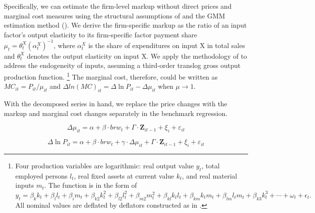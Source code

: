 Specifically, we can estimate the firm-level markup without direct prices and marginal cost measures using the structural assumptions of \cite{deloecker2012markups} and the GMM estimation method (\cite{brooks2021agglomeration}). We derive the firm-specific markup as the ratio of an input factor's output elasticity to its firm-specific factor payment share $\mu_{t}=\theta_{t}^{X}\left(\alpha_{t}^{X}\right)^{-1}$, where $\alpha_{t}^{X}$ is the share of expenditures on input X in total sales and $\theta^X_t$ denotes the output elasticity on input X. We apply the methodology of \cite{ackerberg2015} to address the endogeneity of inputs, assuming a third-order translog gross output production function. \footnote{Four production variables are logarithmic: real output value $y_t$, total employed persons $l_t$, real fixed assets at current value $k_t$, and real material inputs $m_t$. The function is in the form of $
    y_{t}= \beta_{k} k_{t}+\beta_{l} l_{t}+\beta_{i} m_{t}+\beta_{k 2} k_{t}^{2}+\beta_{l 2} l_{t}^{2}+\beta_{m 2} m_{t}^{2}+\beta_{k l} k_{ t} l_{t}+\beta_{k m} k_{t} m_{t}+\beta_{l m} l_{t} m_{t} + \beta_{k 3} k_{t}^{3}+\cdots+\omega_{t}+\epsilon_{t}.
$
All nominal values are deflated by deflators constructed as in \cite{brandt2012}.} The marginal cost, therefore, could be written as $MC_{it}=P_{it} / \mu_{it}$ and $\Delta ln(MC)_{it}= \Delta \ln P_{it} - \Delta \mu_{it}$ when $\mu \rightarrow 1$. 

With the decomposed series in hand, we replace the price changes with the markup and marginal cost changes separately in the benchmark regression. 

\begin{equation}
    \Delta \mu_{it} = \alpha +\beta \cdot brw_{t}+ \Gamma \cdot \textbf{Z}_{it-1}+\xi_{i}+\varepsilon_{it} \label{reg.markup}
\end{equation}

\begin{equation}
    \Delta \ln P_{it} = \alpha+\beta \cdot brw_{t}+ \gamma \cdot \Delta \mu_{it}+ \Gamma \cdot \textbf{Z}_{it-1}+\xi_{i}+\varepsilon_{i t} \label{reg.markup_int}
\end{equation}



